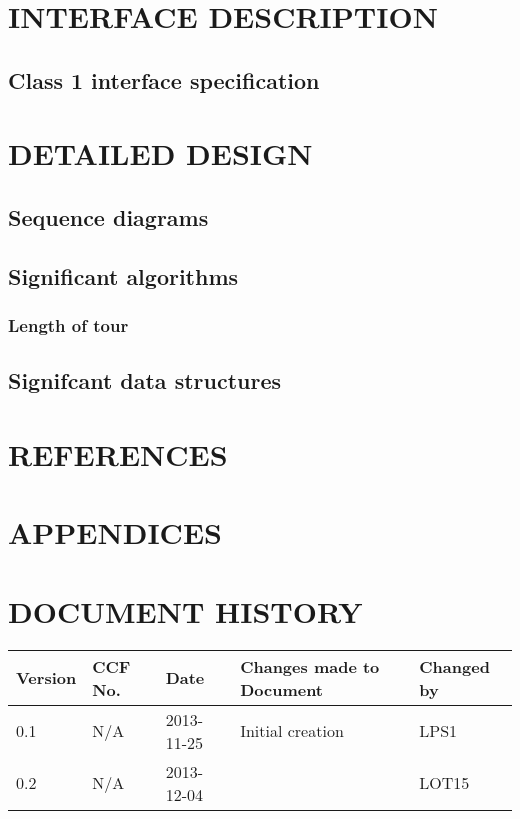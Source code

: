 \documentclass{project}
\begin{document}
\section{INTERFACE DESCRIPTION}
    \subsection{Class 1 interface specification}

\section{DETAILED DESIGN}
    \subsection{Sequence diagrams}
    \subsection{Significant algorithms}

        \subsubsection{Length of tour}
    \subsection{Signifcant data structures}

\section{REFERENCES}

\section{APPENDICES}

    \label{thelastpage}
    \section{DOCUMENT HISTORY}
        \begin{tabular}{|l | l | l | l | l |}
            \hline
            Version & CCF No. & Date & Changes made to Document & Changed by \\
            \hline
            0.1 & N/A & 2013-11-25 & Initial creation & LPS1 \\
            0.2 & N/A & 2013-12-04 &  & LOT15 \\
            \hline
        \end{tabular}
        \label{thelastpage}
\end{document}
